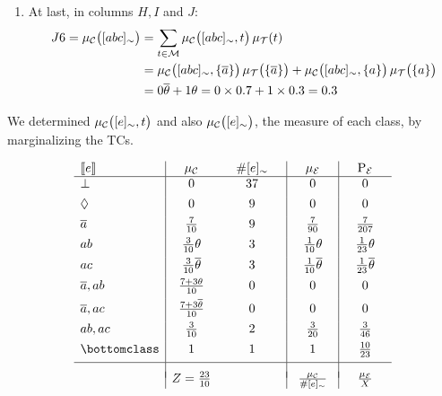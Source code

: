 \documentclass{article}
\begin{document}
\begin{enumerate}
	\item At last, in columns \(H, I\) and \(J\):
	      \begin{equation*}
		      \begin{split}
			      J6 = \pwc{\class{abc}} &= \sum_{t\in\MODELset} \pwc{\class{abc}, t}\pwt{t} \\
			      &=  \pwc{\class{abc}, \set{\co{a}}}\pwt{\set{\co{a}}} +
			      \pwc{\class{abc}, \set{a}}\pwt{\set{a}}  \\
			      &=  0 \co{\theta} +  1 \theta =  0 \times 0.7 +  1\times 0.3 = 0.3
		      \end{split}
	      \end{equation*}
\end{enumerate}

We determined \(\pwc{\class{e}, t}\) and also \(\pwc{\class{e}}\), the
measure of each class, by marginalizing the \aclp{TC}.

\begin{equation*}
	\begin{array}{l|cc|c|c}
		\stablecore{e}
		 & \hspace{1em}\pwC\hspace{1em}
		 & \hspace{1em}\#\class{e}\hspace{1em}
		 & \hspace{1em}\pwE\hspace{1em}
		 & \hspace{1em}\prE\hspace{1em}
		\\
		\hline
		\inconsistent
		 & 0
		 & 37
		 & 0
		 & 0
		\\[4pt]
		\indepclass
		 & 0
		 & 9
		 & 0
		 & 0
		\\[4pt]
		\co{a}
		 & \frac{7}{10}
		 & 9
		 & \frac{7}{90}
		 & \frac{7}{207}
		\\[4pt]
		ab
		 & \frac{3}{10}\theta
		 & 3
		 & \frac{1}{10}\theta
		 & \frac{1}{23}\theta
		\\[4pt]
		ac
		 & \frac{3}{10}\co{\theta}
		 & 3
		 & \frac{1}{10}\co{\theta}
		 & \frac{1}{23}\co{\theta}
		\\[4pt]
		\co{a}, ab
		 & \frac{7 + 3\theta}{10}
		 & 0
		 & 0
		 & 0
		\\[4pt]
		\co{a}, ac
		 & \frac{7 + 3\co{\theta}}{10}
		 & 0
		 & 0
		 & 0
		\\[4pt]
		ab, ac
		 & \frac{3}{10}
		 & 2
		 & \frac{3}{20}
		 & \frac{3}{46}
		\\[4pt]
		\bottomclass
		 & 1
		 & 1
		 & 1
		 & \frac{10}{23}
		\\[4pt]
		\hline
		 &                                     &  &  &
		\\[-0.5em]
		 & Z = \frac{23}{10}
		 &
		 & \frac{\pwC}{\#\class{e}}
		 & \frac{\pwE}{X}
	\end{array}
\end{equation*}
\end{document}
